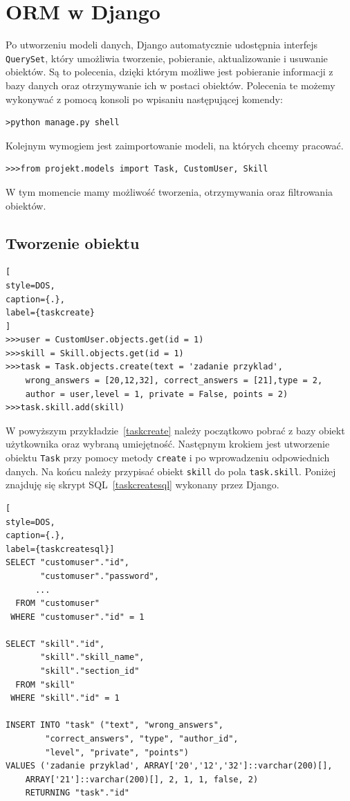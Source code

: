 \documentclass[oneside,polski,logo,indent]{amuthesis}
\begin{document}
\section{ORM w Django}
Po utworzeniu modeli danych, Django automatycznie udostępnia interfejs \texttt{QuerySet}, który umożliwia tworzenie, pobieranie, aktualizowanie i usuwanie obiektów. Są to polecenia, dzięki którym możliwe jest pobieranie informacji z bazy danych oraz otrzymywanie ich w postaci obiektów. Polecenia te możemy wykonywać z pomocą konsoli po wpisaniu następującej komendy:
\begin{lstlisting}[style=DOS]
>python manage.py shell
\end{lstlisting}
Kolejnym wymogiem jest zaimportowanie modeli, na których chcemy pracować.
\begin{lstlisting}[style=DOS]
>>>from projekt.models import Task, CustomUser, Skill
\end{lstlisting}
W tym momencie mamy możliwość tworzenia, otrzymywania oraz filtrowania obiektów.

\begin{center}
\subsection{Tworzenie obiektu}
\end{center}
\begin{lstlisting}[
style=DOS,
caption={.},
label={taskcreate}
]
>>>user = CustomUser.objects.get(id = 1)
>>>skill = Skill.objects.get(id = 1)
>>>task = Task.objects.create(text = 'zadanie przyklad',
	wrong_answers = [20,12,32], correct_answers = [21],type = 2,
	author = user,level = 1, private = False, points = 2)
>>>task.skill.add(skill)

\end{lstlisting}
W powyższym przykładzie~\ref{taskcreate} należy początkowo pobrać z bazy obiekt użytkownika oraz wybraną umiejętność. Następnym krokiem jest utworzenie obiektu \texttt{Task} przy pomocy metody \texttt{create} i po wprowadzeniu odpowiednich danych. Na końcu należy przypisać obiekt \texttt{skill} do pola \texttt{task.skill}. Poniżej znajduję się skrypt SQL~\ref{taskcreatesql} wykonany przez Django.
\begin{lstlisting}[
style=DOS,
caption={.},
label={taskcreatesql}]
SELECT "customuser"."id",
       "customuser"."password",
	  ...
  FROM "customuser"
 WHERE "customuser"."id" = 1

SELECT "skill"."id",
       "skill"."skill_name",
       "skill"."section_id"
  FROM "skill"
 WHERE "skill"."id" = 1

INSERT INTO "task" ("text", "wrong_answers",
		"correct_answers", "type", "author_id",
		"level", "private", "points")
VALUES ('zadanie przyklad', ARRAY['20','12','32']::varchar(200)[],
	ARRAY['21']::varchar(200)[], 2, 1, 1, false, 2) 
	RETURNING "task"."id"
\end{lstlisting}
\end{document}
